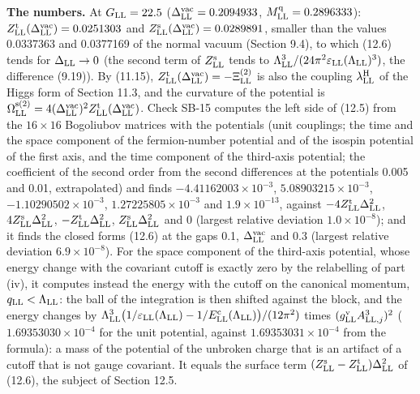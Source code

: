 \documentclass[
  10pt,
]{article}
\begin{document}
\textbf{The numbers.} At \(G_{\rm LL}=22.5\)
(\(\Delta^{\rm vac}_{\rm LL}=0.2094933\),
\(M^{\rm q}_{\rm LL}=0.2896333\)):
\(Z^{\rm t}_{\rm LL}(\Delta^{\rm vac}_{\rm LL})=0.0251303\) and
\(Z^{\rm s}_{\rm LL}(\Delta^{\rm vac}_{\rm LL})=0.0289891\), smaller
than the values 0.0337363 and 0.0377169 of the normal vacuum (Section
9.4), to which (12.6) tends for \(\Delta_{\rm LL}\to0\) (the second term
of \(Z^{\rm s}_{\rm LL}\) tends to
\(\Lambda_{\rm LL}^3/(24\pi^2\varepsilon_{\rm LL}(\Lambda_{\rm LL})^3)\),
the difference (9.19)). By (11.15),
\(Z^{\rm t}_{\rm LL}(\Delta^{\rm vac}_{\rm LL})=-\Xi^{(2)}_{\rm LL}\) is
also the coupling \(\lambda^{\rm H}_{\rm LL}\) of the Higgs form of
Section 11.3, and the curvature of the potential is
\(\Omega^{\rm s(2)}_{\rm LL}=4(\Delta^{\rm vac}_{\rm LL})^2Z^{\rm t}_{\rm LL}(\Delta^{\rm vac}_{\rm LL})\).
Check SB-15 computes the left side of (12.5) from the \(16\times16\)
Bogoliubov matrices with the potentials (unit couplings; the time and
the space component of the fermion-number potential and of the isospin
potential of the first axis, and the time component of the third-axis
potential; the coefficient of the second order from the second
differences at the potentials 0.005 and 0.01, extrapolated) and finds
\(-4.41162003\times10^{-3}\), \(5.08903215\times10^{-3}\),
\(-1.10290502\times10^{-3}\), \(1.27225805\times10^{-3}\) and
\(1.9\times10^{-13}\), against
\(-4Z^{\rm t}_{\rm LL}\Delta_{\rm LL}^2\),
\(4Z^{\rm s}_{\rm LL}\Delta_{\rm LL}^2\),
\(-Z^{\rm t}_{\rm LL}\Delta_{\rm LL}^2\),
\(Z^{\rm s}_{\rm LL}\Delta_{\rm LL}^2\) and 0 (largest relative
deviation \(1.0\times10^{-8}\)); and it finds the closed forms (12.6) at
the gaps 0.1, \(\Delta^{\rm vac}_{\rm LL}\) and 0.3 (largest relative
deviation \(6.9\times10^{-8}\)). For the space component of the
third-axis potential, whose energy change with the covariant cutoff is
exactly zero by the relabelling of part (iv), it computes instead the
energy with the cutoff on the canonical momentum,
\(q_{\rm LL}<\Lambda_{\rm LL}\): the ball of the integration is then
shifted against the block, and the energy changes by
\(\Lambda_{\rm LL}^3\big(1/\varepsilon_{\rm LL}(\Lambda_{\rm LL})-1/E^{\rm c}_{\rm LL}(\Lambda_{\rm LL})\big)/(12\pi^2)\)
times \((g^{\rm v}_{\rm LL}A^3_{{\rm LL},j})^2\)
(\(1.69353030\times10^{-4}\) for the unit potential, against
\(1.69353031\times10^{-4}\) from the formula): a mass of the potential
of the unbroken charge that is an artifact of a cutoff that is not gauge
covariant. It equals the surface term
\((Z^{\rm s}_{\rm LL}-Z^{\rm t}_{\rm LL})\Delta_{\rm LL}^2\) of (12.6),
the subject of Section 12.5.
\end{document}
